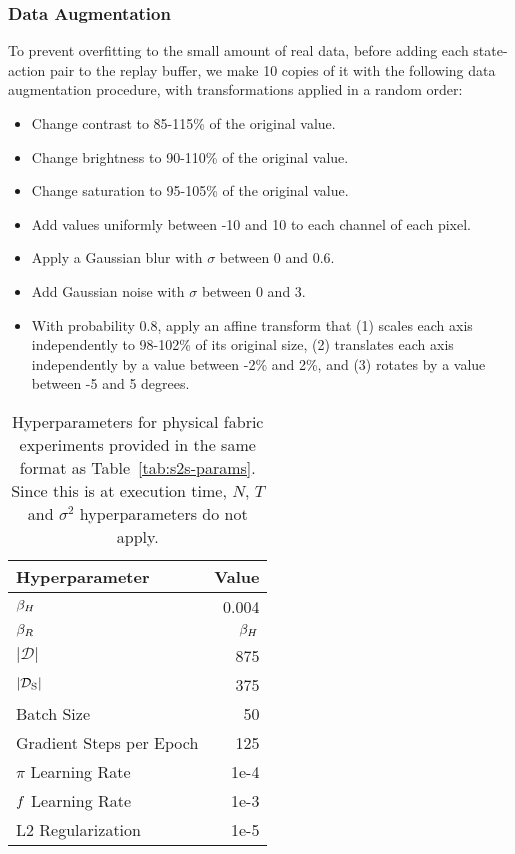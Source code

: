 \subsubsection{Data Augmentation}\label{ssec:dataaug}
To prevent overfitting to the small amount of real data, before adding each state-action pair to the replay buffer, we make 10 copies of it with the following data augmentation procedure, with transformations applied in a random order:
\begin{itemize}
    \item Change contrast to 85-115\% of the original value.
    \item Change brightness to 90-110\% of the original value.
    \item Change saturation to 95-105\% of the original value.
    \item Add values uniformly between -10 and 10 to each channel of each pixel.
    \item Apply a Gaussian blur with $\sigma$ between 0 and 0.6.
    \item Add Gaussian noise with $\sigma$ between 0 and 3.
    \item With probability 0.8, apply an affine transform that (1) scales each axis independently to 98-102\% of its original size, (2) translates each axis independently by a value between -2\% and 2\%, and (3) rotates by a value between -5 and 5 degrees.
\end{itemize}

\begin{table}[!htbp]
\centering
{
 \begin{tabular}{l r} 
Hyperparameter & Value \\
\hline
$\beta_{H}$ & 0.004 \\
$\beta_{R}$ & $\beta_{H}$ \\
$|\mathcal{D}|$ & 875 \\
$|\mathcal{D}_{\rm S}|$ & 375 \\
Batch Size & 50 \\
Gradient Steps per Epoch & 125 \\
$\pi$ Learning Rate & 1e-4 \\
$f$ Learning Rate & 1e-3 \\
L2 Regularization & 1e-5 \\
\end{tabular}}
\caption{Hyperparameters for physical fabric experiments provided in the same format as Table~\ref{tab:s2s-params}. Since this is at execution time, $N$, $T$ and $\sigma^2$ hyperparameters do not apply.}
\label{tab:real-params}
\end{table}